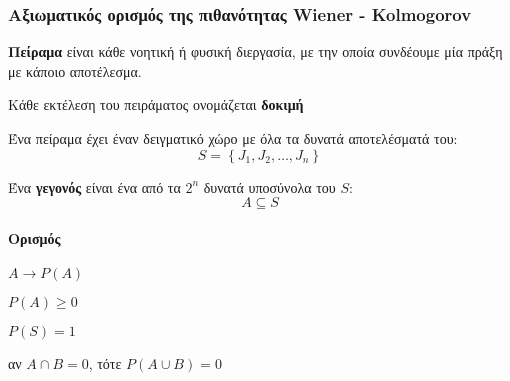 \documentclass[11pt,a4paper,notitlepage,fleqn,final]{article}
\begin{document}
	\subsubsection{Αξιωματικός ορισμός της πιθανότητας
		Wiener - Kolmogorov}
	
	\textbf{Πείραμα} είναι κάθε νοητική ή φυσική διεργασία,
	με την οποία
	συνδέουμε μία πράξη με κάποιο αποτέλεσμα.
	
	Κάθε εκτέλεση του πειράματος ονομάζεται \textbf{δοκιμή}
	
	Ένα πείραμα έχει έναν δειγματικό χώρο με όλα τα δυνατά
	αποτελέσματά του:
	\[
	S = \left\lbrace J_1,J_2,\dots,J_n \right\rbrace
	\]
	
	Ένα \textbf{γεγονός} είναι ένα από τα \( 2^n \) δυνατά
	υποσύνολα του \(S\): \[ A \subseteq S \]
	\paragraph{Ορισμός}
	\( A \to P(A) \)	
	\begin{enumroman}
		\item \( P(A) \geq 0 \)
		\item \( P(S) = 1 \)
		\item αν \( A \cap B = 0 \), τότε \( P(A \cup B)
		= 0 \)
	\end{enumroman}
\end{document}
